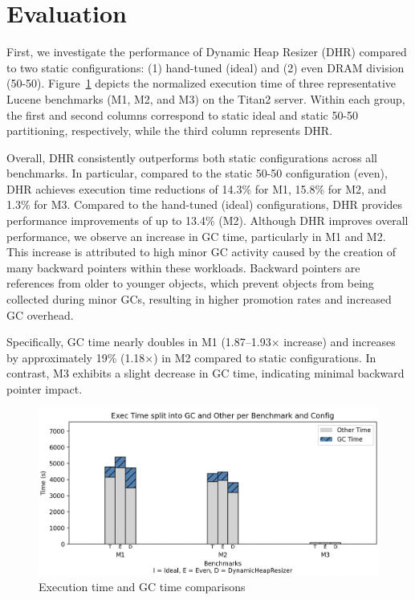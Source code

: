 \section{Evaluation}
First, we investigate the performance of Dynamic Heap Resizer 
(DHR) compared to two static configurations: (1) hand-tuned 
(ideal) and (2) even DRAM division (50-50). 
Figure~\ref{fig:gc_exec_time} depicts the normalized 
execution time of three representative Lucene benchmarks 
(M1, M2, and M3) on the Titan2 server. Within each group,
the first and second columns correspond to static ideal and 
static 50-50 partitioning, respectively, while the third
column represents DHR.

Overall, DHR consistently outperforms both static
configurations across all benchmarks. In particular,
compared to the static 50-50 configuration (even), DHR
achieves execution time reductions of 14.3\% for M1, 15.8\% 
for M2, and 1.3\% for M3. Compared to the hand-tuned (ideal)
configurations, DHR provides performance improvements of 
up to 13.4\% (M2). 
Although DHR improves overall performance, we observe an increase 
in GC time, particularly in M1 and M2. This increase is attributed
to high minor GC activity caused by the creation of many backward 
pointers within these workloads. Backward pointers are references 
from older to younger objects, which prevent objects from being 
collected during minor GCs, resulting in higher promotion rates and
increased GC overhead.

Specifically, GC time nearly doubles in M1 (1.87–1.93× increase) and
increases by approximately 19\% (1.18×) in M2 compared to static configurations. 
In contrast, M3 exhibits a slight decrease in GC time, indicating minimal backward 
pointer impact.


\begin{figure}[htbp]
  \centering
  \includegraphics[width=1\columnwidth]{fig/eval_graph.png}
  \caption{Execution time and GC time comparisons}
  \label{fig:gc_exec_time}
\end{figure}

